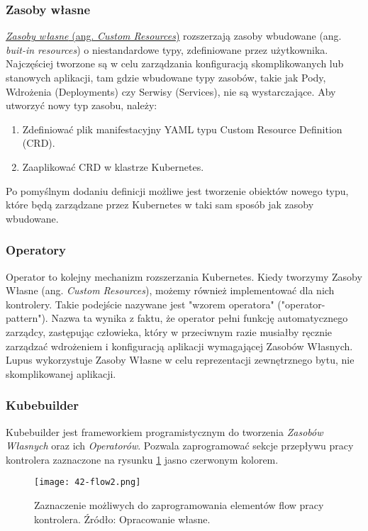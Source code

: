 \subsubsection{Zasoby własne} 

\hyperlink{def:zasoby-wlasne}{\textit{Zasoby własne} (ang. \textit{Custom Resources})} rozszerzają zasoby wbudowane (ang. \textit{buit-in resources}) o niestandardowe typy, zdefiniowane przez użytkownika. Najczęściej tworzone są w celu zarządzania konfiguracją skomplikowanych lub stanowych aplikacji, tam gdzie wbudowane typy zasobów, takie jak Pody, Wdrożenia (Deployments) czy Serwisy (Services), nie są wystarczające. Aby utworzyć nowy typ zasobu, należy:
\begin{enumerate}
    \item Zdefiniować plik manifestacyjny YAML typu Custom Resource Definition (CRD).
    \item Zaaplikować CRD w klastrze Kubernetes.
\end{enumerate}

Po pomyślnym dodaniu definicji możliwe jest tworzenie obiektów nowego typu, które będą zarządzane przez Kubernetes w taki sam sposób jak zasoby wbudowane.

\subsubsection{Operatory}

Operator to kolejny mechanizm rozszerzania Kubernetes. Kiedy tworzymy Zasoby Własne (ang. \textit{Custom Resources}), możemy również implementować dla nich kontrolery. Takie podejście nazywane jest "wzorem operatora" ("operator-pattern"). Nazwa ta wynika z faktu, że operator pełni funkcję automatycznego zarządcy, zastępując człowieka, który w przeciwnym razie musiałby ręcznie zarządzać wdrożeniem i konfiguracją aplikacji wymagającej Zasobów Własnych. Lupus wykorzystuje Zasoby Własne w celu reprezentacji zewnętrznego bytu, nie skomplikowanej aplikacji.
\subsubsection{Kubebuilder}

Kubebuilder jest frameworkiem programistycznym do tworzenia \textit{Zasobów Własnych} oraz ich \textit{Operatorów}. Pozwala zaprogramować sekcje przepływu pracy kontrolera zaznaczone na rysunku \ref{fig:42-flow2} jasno czerwonym kolorem.


\begin{figure}[!h]
    \centering \texttt{[image: 42-flow2.png]}
    \caption{Zaznaczenie możliwych do zaprogramowania elementów flow pracy kontrolera. Źródło: Opracowanie własne.}\label{fig:42-flow2}
\end{figure}